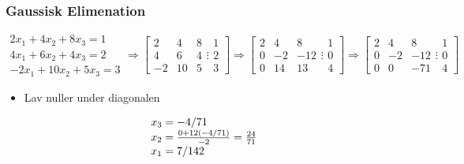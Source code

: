 \documentclass[a4wide,10pt]{article}
\begin{document}
\subsubsection{Gaussisk Elimenation} %
\label{ssub:gaussisk_elimenation}
\[\begin{array}{*{20}{c}}
{2{x_1} + 4{x_2} + 8{x_3} = 1}\\
{4{x_1} + 6{x_2} + 4{x_3} = 2}\\
{ - 2{x_1} + 10{x_2} + 5{x_3} = 3}
\end{array} \Rightarrow \left[ {\begin{array}{*{20}{c}}
2&4&8\\
4&6&4\\
{ - 2}&{10}&5
\end{array} \vdots \begin{array}{*{20}{c}}
1\\
2\\
3
\end{array}} \right] \Rightarrow \left[ {\begin{array}{*{20}{c}}
2&4&8\\
0&{ - 2}&{ - 12}\\
0&{14}&{13}
\end{array} \vdots \begin{array}{*{20}{c}}
1\\
0\\
4
\end{array}} \right] \Rightarrow \left[ {\begin{array}{*{20}{c}}
2&4&8\\
0&{ - 2}&{ - 12}\\
0&0&{ - 71}
\end{array} \vdots \begin{array}{*{20}{c}}
1\\
0\\
4
\end{array}} \right]\]
\begin{itemize}
	\item Lav nuller under diagonalen
\end{itemize}
\[\begin{array}{l}
{x_3} =  - {4 \mathord{\left/
 {\vphantom {4 {71}}} \right.
 \kern-\nulldelimiterspace} {71}}\\
{x_2} = \frac{{0 + 12( - {4 \mathord{\left/
 {\vphantom {4 {71}}} \right.
 \kern-\nulldelimiterspace} {71}})}}{{ - 2}} = \frac{{24}}{{71}}\\
{x_1} = {7 \mathord{\left/
 {\vphantom {7 {142}}} \right.
 \kern-\nulldelimiterspace} {142}}
\end{array}\]


\end{document}
